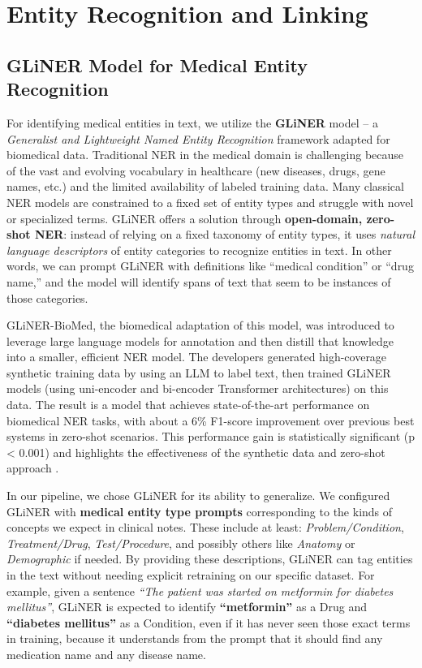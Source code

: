 \section{Entity Recognition and Linking}

\subsection{GLiNER Model for Medical Entity Recognition}
\label{sec:gliner}

For identifying medical entities in text, we utilize the \textbf{GLiNER} model – a \textit{Generalist and Lightweight Named Entity Recognition} framework adapted for biomedical data. Traditional NER in the medical domain is challenging because of the vast and evolving vocabulary in healthcare (new diseases, drugs, gene names, etc.) and the limited availability of labeled training data. Many classical NER models are constrained to a fixed set of entity types and struggle with novel or specialized terms. GLiNER offers a solution through \textbf{open-domain, zero-shot NER}: instead of relying on a fixed taxonomy of entity types, it uses \textit{natural language descriptors} of entity categories to recognize entities in text. In other words, we can prompt GLiNER with definitions like ``medical condition'' or ``drug name,'' and the model will identify spans of text that seem to be instances of those categories.

GLiNER-BioMed, the biomedical adaptation of this model, was introduced to leverage large language models for annotation and then distill that knowledge into a smaller, efficient NER model. The developers generated high-coverage synthetic training data by using an LLM to label text, then trained GLiNER models (using uni-encoder and bi-encoder Transformer architectures) on this data. The result is a model that achieves state-of-the-art performance on biomedical NER tasks, with about a 6\% F1-score improvement over previous best systems in zero-shot scenarios. This performance gain is statistically significant (p < 0.001) and highlights the effectiveness of the synthetic data and zero-shot approach \parencite{Stenetorp2024}.

In our pipeline, we chose GLiNER for its ability to generalize. We configured GLiNER with \textbf{medical entity type prompts} corresponding to the kinds of concepts we expect in clinical notes. These include at least: \textit{Problem/Condition}, \textit{Treatment/Drug}, \textit{Test/Procedure}, and possibly others like \textit{Anatomy} or \textit{Demographic} if needed. By providing these descriptions, GLiNER can tag entities in the text without needing explicit retraining on our specific dataset. For example, given a sentence \textit{``The patient was started on metformin for diabetes mellitus''}, GLiNER is expected to identify \textbf{``metformin''} as a Drug and \textbf{``diabetes mellitus''} as a Condition, even if it has never seen those exact terms in training, because it understands from the prompt that it should find any medication name and any disease name.

